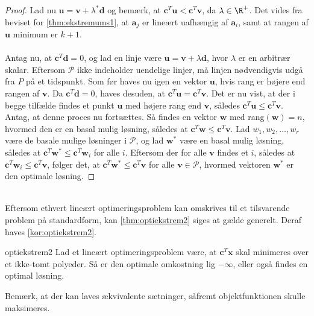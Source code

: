\begin{proof}
Lad nu $\textbf{u} = \textbf{v} + \lambda^* \textbf{d} $ og bemærk, at $ \textbf{c}^T \textbf{u} < \textbf{c}^T \textbf{v}$, da $ \lambda \in \R^+ $. 
Det vides fra beviset for \ref{thm:ekstremums1}, at $\textbf{a}_j$ er lineært uafhængig af $\textbf{a}_i$, samt at rangen af $\textbf{u}$ minimum er $k + 1$. 
\\\\
%
Antag nu, at $\textbf{c}^T \textbf{d} = 0$, og lad en linje være $\textbf{u} = \textbf{v} + \lambda \textbf{d}$, hvor $ \lambda $ er en arbitrær skalar. 
Eftersom $\mathcal{P}$ ikke indeholder uendelige linjer, må linjen nødvendigvis udgå fra $P$ på et tidspunkt. 
Som før haves nu igen en vektor $\textbf{u}$, hvis rang er højere end rangen af $\textbf{v}$. 
Da $\textbf{c}^T \textbf{d} = 0$, haves desuden, at $\textbf{c}^T \textbf{u} = \textbf{c}^T \textbf{v}$. 
Det er nu vist, at der i begge tilfælde findes et punkt $\textbf{u}$ med højere rang end $\textbf{v}$, således $\textbf{c}^T \textbf{u} \leq \textbf{c}^T \textbf{v}$. 
Antag, at denne proces nu fortsættes.
Så findes en vektor $\textbf{w}$ med rang$(\textbf{w})=n$, hvormed den er en basal mulig løsning, således at $\textbf{c}^T \textbf{w} \leq \textbf{c}^T \textbf{v}$. 
Lad $w_1, w_2, \ldots , w_r$ være de basale mulige løsninger i $\mathcal{P}$, og lad $\textbf{w}^*$ være en basal mulig løsning, således at $\textbf{c}^T \textbf{w}^* \leq \textbf{c}^T \textbf{w}_i$ for alle $i$. 
Eftersom der for alle $\textbf{v}$ findes et $i$, således at $\textbf{c}^T \textbf{w}_i \leq \textbf{c}^T \textbf{v}$, følger det, at $\textbf{c}^T \textbf{w}^* \leq \textbf{c}^T \textbf{v}$ for alle $\textbf{v} \in \mathcal{P}$, hvormed vektoren $\textbf{w}^*$ er den optimale løsning. 
\end{proof}
\\
%
Eftersom ethvert lineært optimeringsproblem kan omskrives til et tilsvarende problem på standardform, kan \ref{thm:optiekstrem2} siges at gælde generelt. 
Deraf haves \ref{kor:optiekstrem2}. 
%
\begin{kor}{}{optiekstrem2}
Lad et lineært optimeringsproblem være, at $\textbf{c}^T \textbf{x}$ skal minimeres over et ikke-tomt polyeder.
Så er den optimale omkostning lig $- \infty$, eller også findes en optimal løsning. 
\end{kor}
\noindent
%
Bemærk, at der kan laves ækvivalente sætninger, såfremt objektfunktionen skulle maksimeres.